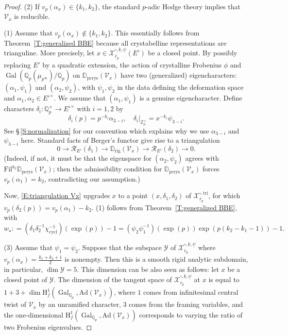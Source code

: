 \documentclass[12pt]{amsart}
\theoremstyle{definition}
\numberwithin{equation}{subsection}
\def\calR{\mathcal{R}}
\def\calV{\mathcal{V}}
\def\calX{\mathcal{X}}
\def\calY{\mathcal{Y}}
\def\DD{\mathbb{D}}
\def\QQ{\mathbb{Q}}
\def\ZZ{\mathbb{Z}}
\def\rmH{\mathrm{H}}
\DeclareMathOperator{\Gal}{Gal}
\newcommand{\cycl}{\mathrm{cycl}}
\newcommand{\Fil}{\mathrm{Fil}}
\newcommand{\rig}{\mathrm{rig}}
\newcommand{\tri}{\mathrm{tri}}
\begin{document}
\begin{proof}
(2) If $v_p(\alpha_x) \in \{k_1, k_2\}$, the standard $p$-adic Hodge theory implies that $\calV_x$ is reducible.

(1) Assume that $v_p(\alpha_x) \notin\{k_1, k_2\}$.
This essentially follows from Theorem~\ref{T:generalized BBE} because all crystabelline representations are trianguline. More precisely, let $x \in \calX_{\bar r_p}^{\square, \underline k,\underline \psi} (E')$ be a closed point. By possibly replacing $E'$ by a quadratic extension,
the action of crystalline Frobenius $\phi$ and $\Gal(\QQ_p(\mu_{p^\infty})/\QQ_p)$ on $\DD_\mathrm{pcrys}(\calV_x)$ have two (generalized) eigencharacters: $(\alpha_1, \psi_1)$ and $(\alpha_2, \psi_2)$, with $\psi_1, \psi_2$ in the data defining the deformation space and $\alpha_1, \alpha_2 \in E'^\times$. We assume that $(\alpha_1, \psi_1)$ is a genuine eigencharacter.  Define characters $\delta_i: \QQ_p^\times \to E'^\times$ with $i=1,2$ by
$$
\delta_i(p) = p^{-k_i}{\alpha_{3-i}},\quad  \delta_i|_{\ZZ_p^\times} = x^{-k_i}\psi_{3-i}.
$$
See \S\,\ref{S:normalization} for our convention which explains why we use $\alpha_{3-i}$ and $\psi_{3-i}$ here.
Standard facts of Berger's functor give rise to a triangulation
\begin{equation}
\label{E:triangulation Vx}
0 \to \calR_{E'}(\delta_1) \to \DD_\rig(\calV_x) \to \calR_{E'}(\delta_2) \to 0.
\end{equation}
(Indeed, if not, it must be that the eigenspace for $(\alpha_2, \psi_2)$ agrees with $\Fil^{k_2}\DD_\mathrm{pcrys}(\calV_x)$; then the admissibility condition for $\DD_\mathrm{pcrys}(\calV_x)$ forces $v_p(\alpha_1) = k_2$, contradicting  our assumption.)

Now, \eqref{E:triangulation Vx} upgrades $x$ to a point $(x, \delta_1, \delta_2)$ of $\calX_{\bar r_p}^{\square, \tri}$, for which $v_p(\delta_2(p)) = v_p(\alpha_1)-k_2$. (1) follows from Theorem~\ref{T:generalized BBE}, with
\begin{equation}
\label{E:w star for k1k2}
w_\star: = (\delta_1\delta_2^{-1}\chi_\cycl^{-1})(\exp(p))-1 =  (\psi_2\psi_1^{-1})(\exp(p))\exp(p(k_2-k_1-1)) -1.
\end{equation}

(3) Assume that $\psi_1 = \psi_2$. Suppose that the subspace $\calY$ of $\calX_{\bar r_p}^{\square, \underline k, \underline \psi}$ where $v_p(\alpha_x) =\frac{k_1+k_2+1}2$ is nonempty. Then this is a smooth rigid analytic subdomain, in particular, $\dim \calY = 5$. 
This dimension can be also seen as follows: let $x$ be a closed point of $\calY$. The dimension of the tangent space of $\calX_{\bar r_p}^{\square, \underline k ,\underline \psi}$ at $x$ is equal to $1+3+\dim\rmH^1_f(\Gal_{\QQ_p}, \mathrm{Ad}(\calV_x))$, where $1$ comes from infinitesimal central twist of $\calV_x$ by an unramified character, $3$ comes from the framing variables, and the one-dimensional $\rmH^1_f(\Gal_{\QQ_p}, \mathrm{Ad}(\calV_x))$ corresponds to varying the ratio of two Frobenius eigenvalues.


\end{proof}
\end{document}
